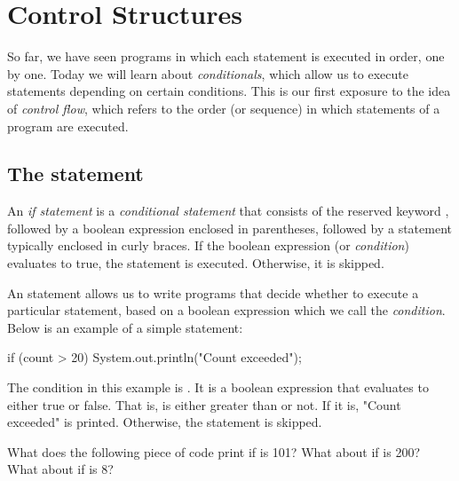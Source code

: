 \chapter{Control Structures}

So far, we have seen programs in which each statement is executed in order, one by one. Today we will learn about \emph{conditionals}, which allow us to execute statements depending on certain conditions. This is our first exposure to the idea of \emph{control flow}, which refers to the order (or sequence) in which statements of a program are executed.

\section{The  statement}

\begin{definition}
An \emph{if statement} is a \emph{conditional statement} that consists of the reserved keyword , followed by a boolean expression enclosed in parentheses, followed by a statement typically enclosed in curly braces. If the boolean expression (or \emph{condition}) evaluates to true, the statement is executed. Otherwise, it is skipped.
\end{definition}

An  statement allows us to write programs that decide whether to execute a particular statement, based on a boolean expression which we call the \emph{condition}. Below is an example of a simple  statement:

\begin{code}
if (count > 20) {
    System.out.println("Count exceeded");
}
\end{code}

The condition in this example is . It is a boolean expression that evaluates to either true or false. That is,  is either greater than  or not. If it is, "Count exceeded" is printed. Otherwise, the  statement is skipped. 

\begin{example}
What does the following piece of code print if  is 101? What about if  is 200? What about if  is 8?

\end{example}

